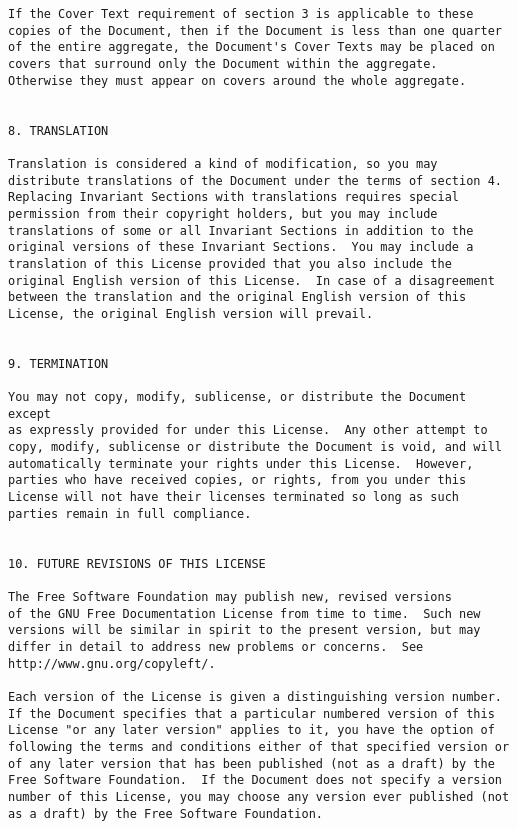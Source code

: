 \documentclass[12pt]{article}
\begin{document}
\begin{verbatim}
If the Cover Text requirement of section 3 is applicable to these
copies of the Document, then if the Document is less than one quarter
of the entire aggregate, the Document's Cover Texts may be placed on
covers that surround only the Document within the aggregate.
Otherwise they must appear on covers around the whole aggregate.


8. TRANSLATION

Translation is considered a kind of modification, so you may
distribute translations of the Document under the terms of section 4.
Replacing Invariant Sections with translations requires special
permission from their copyright holders, but you may include
translations of some or all Invariant Sections in addition to the
original versions of these Invariant Sections.  You may include a
translation of this License provided that you also include the
original English version of this License.  In case of a disagreement
between the translation and the original English version of this
License, the original English version will prevail.


9. TERMINATION

You may not copy, modify, sublicense, or distribute the Document except
as expressly provided for under this License.  Any other attempt to
copy, modify, sublicense or distribute the Document is void, and will
automatically terminate your rights under this License.  However,
parties who have received copies, or rights, from you under this
License will not have their licenses terminated so long as such
parties remain in full compliance.


10. FUTURE REVISIONS OF THIS LICENSE

The Free Software Foundation may publish new, revised versions
of the GNU Free Documentation License from time to time.  Such new
versions will be similar in spirit to the present version, but may
differ in detail to address new problems or concerns.  See
http://www.gnu.org/copyleft/.

Each version of the License is given a distinguishing version number.
If the Document specifies that a particular numbered version of this
License "or any later version" applies to it, you have the option of
following the terms and conditions either of that specified version or
of any later version that has been published (not as a draft) by the
Free Software Foundation.  If the Document does not specify a version
number of this License, you may choose any version ever published (not
as a draft) by the Free Software Foundation.



\end{verbatim}
\end{document}
